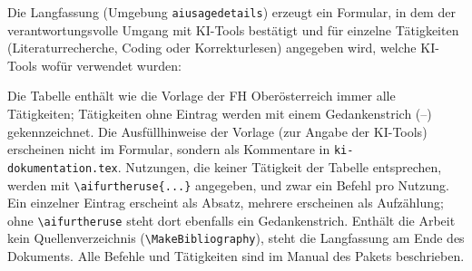 Die Langfassung (Umgebung \texttt{aiusagedetails}) erzeugt ein Formular, in dem
der verantwortungsvolle Umgang mit KI-Tools bestätigt und für einzelne
Tätigkeiten (\zB Literaturrecherche, Coding oder Korrekturlesen) angegeben
wird, welche KI-Tools wofür verwendet wurden:
%
\begin{LaTeXCode}[numbers=none]
\begin{aiusagedetails}
\end{aiusagedetails}
\end{LaTeXCode}
%
Die Tabelle enthält wie die Vorlage der FH Oberösterreich immer alle
Tätigkeiten; Tätigkeiten ohne Eintrag werden mit einem Gedankenstrich (--)
gekennzeichnet. Die Ausfüllhinweise der Vorlage (\zB zur Angabe der KI-Tools)
erscheinen nicht im Formular, sondern als Kommentare in
\verb!ki-dokumentation.tex!. Nutzungen, die keiner Tätigkeit der Tabelle
entsprechen, werden mit \verb!\aifurtheruse{...}! angegeben, und zwar ein Befehl
pro Nutzung. Ein einzelner Eintrag erscheint als Absatz, mehrere erscheinen als
Aufzählung; ohne \verb!\aifurtheruse! steht dort ebenfalls ein Gedankenstrich.
Enthält die Arbeit kein Quellenverzeichnis (\verb!\MakeBibliography!), steht
die Langfassung am Ende des Dokuments.
Alle Befehle und Tätigkeiten sind im Manual des Pakets beschrieben.
